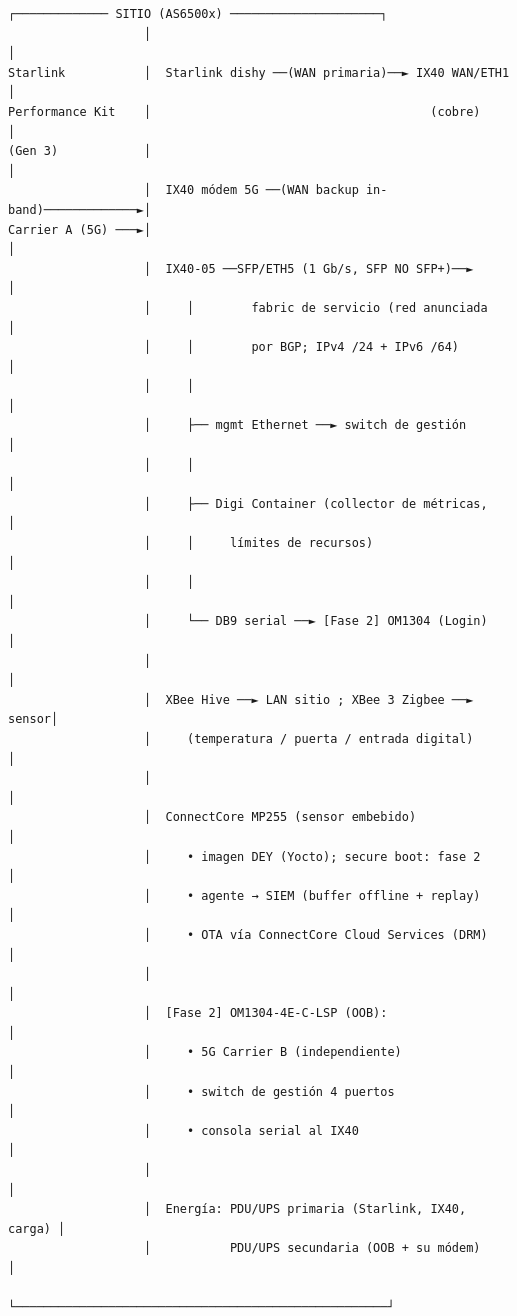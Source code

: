 \documentclass[11pt,a4paper]{article}
\begin{document}
\begin{diagbox}
\begin{Verbatim}[fontsize=\footnotesize]
                   ┌───────────── SITIO (AS6500x) ─────────────────────┐
                   │                                                    │
Starlink           │  Starlink dishy ──(WAN primaria)──► IX40 WAN/ETH1 │
Performance Kit    │                                       (cobre)      │
(Gen 3)            │                                                    │
                   │  IX40 módem 5G ──(WAN backup in-band)─────────────►│
Carrier A (5G) ───►│                                                    │
                   │  IX40-05 ──SFP/ETH5 (1 Gb/s, SFP NO SFP+)──►      │
                   │     │        fabric de servicio (red anunciada     │
                   │     │        por BGP; IPv4 /24 + IPv6 /64)         │
                   │     │                                              │
                   │     ├── mgmt Ethernet ──► switch de gestión        │
                   │     │                                              │
                   │     ├── Digi Container (collector de métricas,     │
                   │     │     límites de recursos)                     │
                   │     │                                              │
                   │     └── DB9 serial ──► [Fase 2] OM1304 (Login)    │
                   │                                                    │
                   │  XBee Hive ──► LAN sitio ; XBee 3 Zigbee ──► sensor│
                   │     (temperatura / puerta / entrada digital)       │
                   │                                                    │
                   │  ConnectCore MP255 (sensor embebido)               │
                   │     • imagen DEY (Yocto); secure boot: fase 2      │
                   │     • agente → SIEM (buffer offline + replay)      │
                   │     • OTA vía ConnectCore Cloud Services (DRM)     │
                   │                                                    │
                   │  [Fase 2] OM1304-4E-C-LSP (OOB):                  │
                   │     • 5G Carrier B (independiente)                 │
                   │     • switch de gestión 4 puertos                  │
                   │     • consola serial al IX40                       │
                   │                                                    │
                   │  Energía: PDU/UPS primaria (Starlink, IX40, carga) │
                   │           PDU/UPS secundaria (OOB + su módem)      │
                   └────────────────────────────────────────────────────┘
\end{Verbatim}
\end{diagbox}
\end{document}
